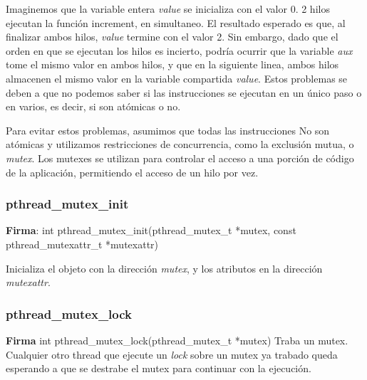 \documentclass[oneside]{article}
\begin{document}
			Imaginemos que la variable entera \emph{value} se inicializa con el valor 0. 2 hilos ejecutan la función increment, en simultaneo. El resultado esperado es que, al finalizar ambos hilos, \emph{value} termine con el valor 2.
			Sin embargo, dado que el orden en que se ejecutan los hilos es incierto, podría ocurrir que la variable \emph{aux} tome el mismo valor en ambos hilos, y que en la siguiente linea, ambos hilos almacenen el mismo valor en la variable compartida \emph{value}. Estos problemas se deben a que no podemos saber si las instrucciones se ejecutan en un único paso o en varios, es decir, si son atómicas o no.

			Para evitar estos problemas, asumimos que todas las instrucciones No son atómicas y utilizamos restricciones de concurrencia, como la exclusión mutua, o \emph{mutex}. Los mutexes se utilizan para controlar el acceso a una porción de código de la aplicación, permitiendo el acceso de un hilo por vez.

			\subsubsection{pthread\_mutex\_init}
			\textbf{Firma}: int pthread\_mutex\_init(pthread\_mutex\_t *mutex, const pthread\_mutexattr\_t *mutexattr)\par
			Inicializa el objeto con la dirección \emph{mutex}, y los atributos en la dirección \emph{mutexattr}.\\

			\subsubsection{pthread\_mutex\_lock}
			\textbf{Firma} int pthread\_mutex\_lock(pthread\_mutex\_t *mutex)
			Traba un mutex. Cualquier otro thread que ejecute un \emph{lock} sobre un mutex ya trabado queda esperando a que se destrabe el mutex para continuar con la ejecución.
\end{document}
